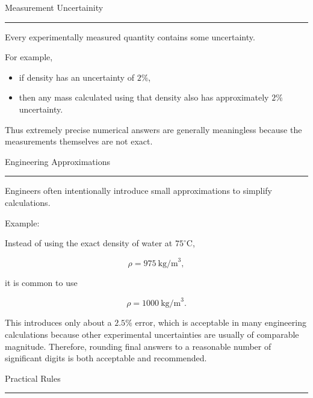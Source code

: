 \documentclass[12pt]{article}
\begin{document}

\vspace{15pt}
{\headingfont\large Measurement Uncertainity}
\par
\vspace{4pt}
\hrule
\vspace{10pt}
Every experimentally measured quantity contains some uncertainty.

For example,

\begin{itemize}
\item if density has an uncertainty of \(2\%\),
\item then any mass calculated using that density also has approximately
\(2\%\) uncertainty.
\end{itemize}

Thus extremely precise numerical answers are generally meaningless because
the measurements themselves are not exact. 


\vspace{15pt}
{\headingfont\large Engineering Approximations}
\par
\vspace{4pt}
\hrule
\vspace{10pt}

Engineers often intentionally introduce small approximations to simplify
calculations.

Example:

Instead of using the exact density of water at \(75^\circ\mathrm{C}\),

\[
\rho=975~\text{kg/m}^3,
\]

it is common to use

\[
\rho=1000~\text{kg/m}^3.
\]

This introduces only about a \(2.5\%\) error, which is acceptable in many
engineering calculations because other experimental uncertainties are usually
of comparable magnitude. Therefore, rounding final answers to a reasonable
number of significant digits is both acceptable and recommended. 

\newpage

\vspace{15pt}
{\headingfont\large Practical Rules}
\par
\vspace{4pt}
\hrule
\vspace{10pt}
\end{document}
